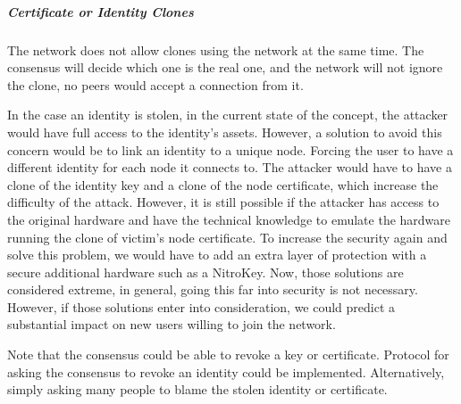 \subparagraph{Certificate or Identity Clones} The network does not allow clones using the network at the same time. The consensus will decide which one is the real one, and the network will not ignore the clone, no peers would accept a connection from it.

In the case an identity is stolen, in the current state of the concept, the attacker would have full access to the identity's assets. However, a solution to avoid this concern would be to link an identity to a unique node. Forcing the user to have a different identity for each node it connects to. The attacker would have to have a clone of the identity key and a clone of the node certificate, which increase the difficulty of the attack. However, it is still possible if the attacker has access to the original hardware and have the technical knowledge to emulate the hardware running the clone of victim's node certificate. To increase the security again and solve this problem, we would have to add an extra layer of protection with a secure additional hardware such as a NitroKey\cite{NitrokeyNitokey}. Now, those solutions are considered extreme, in general, going this far into security is not necessary.  However, if those solutions enter into consideration, we could predict a substantial impact on new users willing to join the network.

Note that the consensus could be able to revoke a key or certificate. Protocol for asking the consensus to revoke an identity could be implemented. Alternatively, simply asking many people to blame the stolen identity or certificate.

